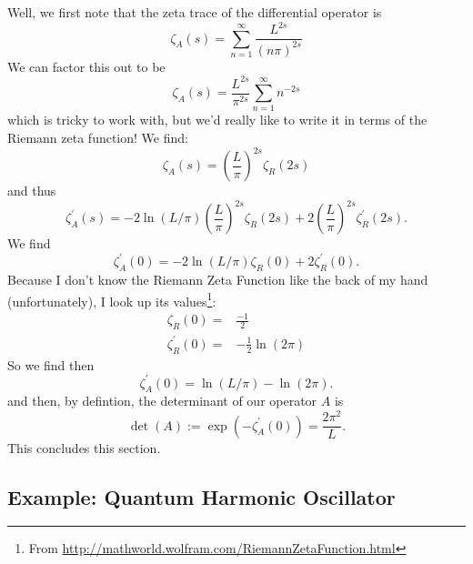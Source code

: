 Well, we first note that the zeta trace of the differential operator is
\begin{equation}
\zeta_{A}(s) = \sum^{\infty}_{n=1} \frac{L^{2s}}{(n\pi)^{2s}}
\label{eq:detA}
\end{equation}
We can factor this out to be
\begin{equation}
\zeta_{A}(s) = \frac{L^{2s}}{\pi^{2s}}\sum^{\infty}_{n=1} n^{-2s}
\end{equation}
which is tricky to work with, but we'd really like to write it in terms of the Riemann zeta function! We find:
\begin{equation}
\zeta_{A}(s) = \left(\frac{L}{\pi}\right)^{2s}\zeta_{R}(2s)
\end{equation}
and thus
\begin{equation}
\zeta_{A}^{\prime}(s) = -2\ln(L/\pi)\left(\frac{L}{\pi}\right)^{2s}\zeta_{R}(2s) + 2\left(\frac{L}{\pi}\right)^{2s}\zeta_{R}^{\prime}(2s).
\end{equation}
We find
\begin{equation}
\zeta_{A}^{\prime}(0) = -2\ln(L/\pi)\zeta_{R}(0) + 2\zeta_{R}^{\prime}(0).
\end{equation}
Because I don't know the Riemann Zeta Function like the back of my hand (unfortunately), I look up its values\footnote{From \url{http://mathworld.wolfram.com/RiemannZetaFunction.html}}:
\begin{equation}
\begin{split}
\zeta_{R}(0)  = & \frac{-1}{2}\\
\zeta_{R}^{\prime}(0)  = & -\frac{1}{2}\ln(2\pi)
\end{split}
\end{equation}
So we find then
\begin{equation}
\zeta_{A}^{\prime}(0) = \ln(L/\pi) - \ln(2\pi).
\end{equation}
and then, by defintion, the determinant of our operator $A$ is
\begin{equation}
\det{(A)} := \exp{(-\zeta_{A}^{\prime}(0))} = \frac{2\pi^2}{L}.
\end{equation}
This concludes this section.

\subsection{Example: Quantum Harmonic Oscillator}

